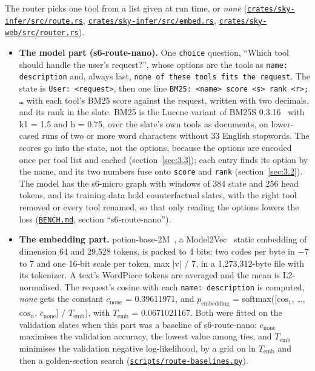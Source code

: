 \documentclass[10pt]{article}
\begin{document}
The router picks one tool from a list given at run time, or \emph{none} (\href{https://github.com/maxgfr/skycmd/blob/main/crates/sky-infer/src/route.rs}{\texttt{crates/\allowbreak{}sky-infer/\allowbreak{}src/\allowbreak{}route.rs}}, \href{https://github.com/maxgfr/skycmd/blob/main/crates/sky-infer/src/embed.rs}{\texttt{crates/\allowbreak{}sky-infer/\allowbreak{}src/\allowbreak{}embed.rs}}, \href{https://github.com/maxgfr/skycmd/blob/main/crates/sky-web/src/router.rs}{\texttt{crates/\allowbreak{}sky-web/\allowbreak{}src/\allowbreak{}router.rs}}).

\begin{itemize}
\item \textbf{The model part (s6-route-nano).} One \texttt{choice} question, ``Which tool should handle the user's request?'', whose options are the tools as \texttt{name: description} and, always last, \texttt{none of these tools fits the request}. The state is \texttt{User: \textless{}request\textgreater{}}, then one line \texttt{BM25: \textless{}name\textgreater{} score \textless{}s\textgreater{} rank \textless{}r\textgreater{}; \ldots{}} with each tool's BM25 score against the request, written with two decimals, and its rank in the slate. BM25 is the Lucene variant of BM25S 0.3.16~\cite{lu2024bm25s} with k1 = 1.5 and b = 0.75, over the slate's own tools as documents, on lower-cased runs of two or more word characters without 33 English stopwords. The scores go into the state, not the options, because the options are encoded once per tool list and cached (section~\ref{sec:3.3}); each entry finds its option by the name, and its two numbers fuse onto \texttt{score} and \texttt{rank} (section~\ref{sec:3.2}). The model has the s6-micro graph with windows of 384 state and 256 head tokens, and its training data hold counterfactual slates, with the right tool removed or every tool renamed, so that only reading the options lowers the loss (\href{https://github.com/maxgfr/skycmd/blob/main/BENCH.md}{\texttt{BENCH.md}}, section ``s6-route-nano'').
\item \textbf{The embedding part.} potion-base-2M~\cite{potion}, a Model2Vec~\cite{model2vec} static embedding of dimension 64 and 29,528 tokens, is packed to 4 bits: two codes per byte in $-$7 to 7 and one 16-bit scale per token, max |v| / 7, in a 1,273,312-byte file with its tokenizer. A text's WordPiece tokens are averaged and the mean is L2-normalised. The request's cosine with each \texttt{name: description} is computed, \emph{none} gets the constant $c_{\mathrm{none}}$ = 0.39611971, and $p_{\mathrm{embedding}}$ = softmax([$\mathrm{cos}_{1}$, \ldots{}, $\mathrm{cos}_{n}$, $c_{\mathrm{none}}$] / $T_{\mathrm{emb}}$), with $T_{\mathrm{emb}}$ = 0.0671021167. Both were fitted on the validation slates when this part was a baseline of s6-route-nano: $c_{\mathrm{none}}$ maximises the validation accuracy, the lowest value among ties, and $T_{\mathrm{emb}}$ minimises the validation negative log-likelihood, by a grid on ln $T_{\mathrm{emb}}$ and then a golden-section search (\href{https://github.com/maxgfr/skycmd/blob/main/scripts/route-baselines.py}{\texttt{scripts/\allowbreak{}route-baselines.py}}).

\end{itemize}
\end{document}
